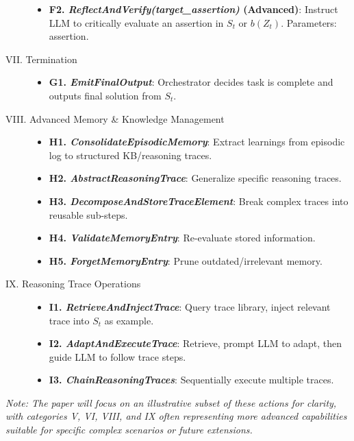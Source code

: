 \documentclass[11pt]{article}
\begin{document}
\begin{description}
\begin{itemize}
            \item \textbf{F2. \emph{ReflectAndVerify(target_assertion)} (Advanced)}: Instruct LLM to critically evaluate an assertion in $S_t$ or $b(Z_t)$. Parameters: assertion.
        \end{itemize}
    \item[VII. Termination]
        \begin{itemize}
            \item \textbf{G1. \emph{EmitFinalOutput}}: Orchestrator decides task is complete and outputs final solution from $S_t$.
        \end{itemize}
    \item[VIII. Advanced Memory & Knowledge Management]
        \begin{itemize}
            \item \textbf{H1. \emph{ConsolidateEpisodicMemory}}: Extract learnings from episodic log to structured KB/reasoning traces.
            \item \textbf{H2. \emph{AbstractReasoningTrace}}: Generalize specific reasoning traces.
            \item \textbf{H3. \emph{DecomposeAndStoreTraceElement}}: Break complex traces into reusable sub-steps.
            \item \textbf{H4. \emph{ValidateMemoryEntry}}: Re-evaluate stored information.
            \item \textbf{H5. \emph{ForgetMemoryEntry}}: Prune outdated/irrelevant memory.
        \end{itemize}
    \item[IX. Reasoning Trace Operations]
        \begin{itemize}
            \item \textbf{I1. \emph{RetrieveAndInjectTrace}}: Query trace library, inject relevant trace into $S_t$ as example.
            \item \textbf{I2. \emph{AdaptAndExecuteTrace}}: Retrieve, prompt LLM to adapt, then guide LLM to follow trace steps.
            \item \textbf{I3. \emph{ChainReasoningTraces}}: Sequentially execute multiple traces.
        \end{itemize}
\end{description}
\textit{Note: The paper will focus on an illustrative subset of these actions for clarity, with categories V, VI, VIII, and IX often representing more advanced capabilities suitable for specific complex scenarios or future extensions.}
\end{document}
